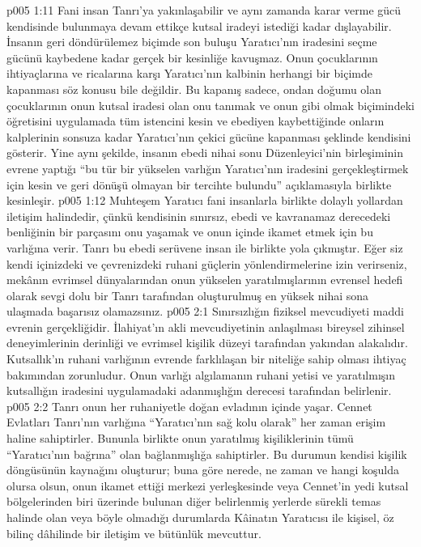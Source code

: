 \vs p005 1:11 Fani insan Tanrı’ya yakınlaşabilir ve aynı zamanda karar verme gücü kendisinde bulunmaya devam ettikçe kutsal iradeyi istediği kadar dışlayabilir. İnsanın geri döndürülemez biçimde son buluşu Yaratıcı’nın iradesini seçme gücünü kaybedene kadar gerçek bir kesinliğe kavuşmaz. Onun çocuklarının ihtiyaçlarına ve ricalarına karşı Yaratıcı’nın kalbinin herhangi bir biçimde kapanması söz konusu bile değildir. Bu kapanış sadece, ondan doğumu olan çocuklarının onun kutsal iradesi olan onu tanımak ve onun gibi olmak biçimindeki öğretisini uygulamada tüm istencini kesin ve ebediyen kaybettiğinde onların kalplerinin sonsuza kadar Yaratıcı’nın çekici gücüne kapanması şeklinde kendisini gösterir. Yine aynı şekilde, insanın ebedi nihai sonu Düzenleyici’nin birleşiminin evrene yaptığı “bu tür bir yükselen varlığın Yaratıcı’nın iradesini gerçekleştirmek için kesin ve geri dönüşü olmayan bir tercihte bulundu” açıklamasıyla birlikte kesinleşir.
\vs p005 1:12 Muhteşem Yaratıcı fani insanlarla birlikte dolaylı yollardan iletişim halindedir, çünkü kendisinin sınırsız, ebedi ve kavranamaz derecedeki benliğinin bir parçasını onu yaşamak ve onun içinde ikamet etmek için bu varlığına verir. Tanrı bu ebedi serüvene insan ile birlikte yola çıkmıştır. Eğer siz kendi içinizdeki ve çevrenizdeki ruhani güçlerin yönlendirmelerine izin verirseniz, mekânın evrimsel dünyalarından onun yükselen yaratılmışlarının evrensel hedefi olarak sevgi dolu bir Tanrı tarafından oluşturulmuş en yüksek nihai sona ulaşmada başarısız olamazsınız.
\vs p005 2:1 Sınırsızlığın fiziksel mevcudiyeti maddi evrenin gerçekliğidir. İlahiyat’ın akli mevcudiyetinin anlaşılması bireysel zihinsel deneyimlerinin derinliği ve evrimsel kişilik düzeyi tarafından yakından alakalıdır. Kutsallık’ın ruhani varlığının evrende farklılaşan bir niteliğe sahip olması ihtiyaç bakımından zorunludur. Onun varlığı algılamanın ruhani yetisi ve yaratılmışın kutsallığın iradesini uygulamadaki adanmışlığın derecesi tarafından belirlenir.
\vs p005 2:2 Tanrı onun her ruhaniyetle doğan evladının içinde yaşar. Cennet Evlatları Tanrı’nın varlığına “Yaratıcı’nın sağ kolu olarak” her zaman erişim haline sahiptirler. Bununla birlikte onun yaratılmış kişiliklerinin tümü “Yaratıcı’nın bağrına” olan bağlanmışlığa sahiptirler. Bu durumun kendisi kişilik döngüsünün kaynağını oluşturur; buna göre nerede, ne zaman ve hangi koşulda olursa olsun, onun ikamet ettiği merkezi yerleşkesinde veya Cennet’in yedi kutsal bölgelerinden biri üzerinde bulunan diğer belirlenmiş yerlerde sürekli temas halinde olan veya böyle olmadığı durumlarda Kâinatın Yaratıcısı ile kişisel, öz bilinç dâhilinde bir iletişim ve bütünlük mevcuttur.
